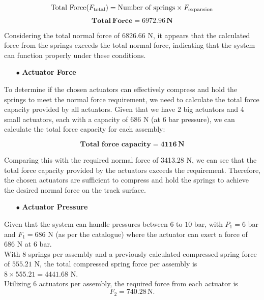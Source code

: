 \begin{equation}
\begin{aligned}
    \text{Total Force} (F_{\text{total}}) &= \text{Number of springs} \times F_{\text{expansion}}\notag \\
     \end{aligned}
\end{equation}
\begin{equation}
   \mathbf{Total\ Force} = \mathbf{6972.96 \, N}
\end{equation}



Considering the total normal force of 6826.66 N, it appears that the calculated force from the springs exceeds the total normal force, indicating that the system can function properly under these conditions.



\begin{itemize}[leftmargin=*]
    \item[$\bullet$] \textbf{Actuator Force}
\end{itemize}

\noindent
To determine if the chosen actuators can effectively compress and hold the springs to meet the normal force requirement, we need to calculate the total force capacity provided by all actuators. Given that we have 2 big actuators and 4 small actuators, each with a capacity of 686 N (at 6 bar pressure), we can calculate the total force capacity for each assembly:

\[
\textbf{Total force capacity} = \mathbf{4116} \, \textbf{N}
\]

Comparing this with the required normal force of 3413.28 N, we can see that the total force capacity provided by the actuators exceeds the requirement. Therefore, the chosen actuators are sufficient to compress and hold the springs to achieve the desired normal force on the track surface.

\newpage
\begin{itemize}[leftmargin=*]
    \item[$\bullet$] \textbf{Actuator Pressure}
\end{itemize}
\noindent
Given that the system can handle pressures between $6$ to $10$ bar, with $P_1 = 6$ bar and $F_1 = 686$ N (as per the catalogue) where the actuator can exert a force of $686$ N at $6$ bar.\\

With $8$ springs per assembly and a previously calculated compressed spring force of $555.21$ N, the total compressed spring force per assembly is $8 \times 555.21 = 4441.68$ N.\\
\noindent
Utilizing $6$ actuators per assembly, the required force from each actuator is 
\[
F_2 = 740.28 \, \text{N}.
\]

